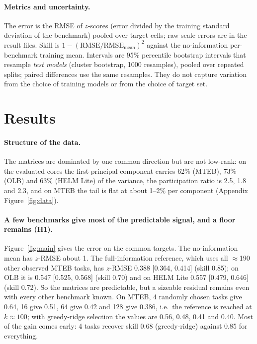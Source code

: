 \documentclass{article}
\begin{document}
\paragraph{Metrics and uncertainty.} The error is the RMSE of $z$-scores (error divided by the training standard deviation of the benchmark) pooled over target cells; raw-scale errors are in the result files. Skill is $1-(\mathrm{RMSE}/\mathrm{RMSE}_{\mathrm{mean}})^2$ against the no-information per-benchmark training mean. Intervals are 95\% percentile bootstrap intervals that resample \emph{test models} (cluster bootstrap, 1000 resamples), pooled over repeated splits; paired differences use the same resamples. They do not capture variation from the choice of training models or from the choice of target set.

\section{Results}
\label{sec:results}
\begin{table}[t]
\caption{The three score matrices. The evaluated core of MTEB is the dense core described in Section~\ref{sec:protocol}.}
\label{tab:data}
\centering\scriptsize
\resizebox{\linewidth}{!}{}
\end{table}

\paragraph{Structure of the data.} The matrices are dominated by one common direction but are not low-rank: on the evaluated cores the first principal component carries 62\% (MTEB), 73\% (OLB) and 63\% (HELM Lite) of the variance, the participation ratio is 2.5, 1.8 and 2.3, and on MTEB the tail is flat at about 1--2\% per component (Appendix Figure~\ref{fig:data}).



\paragraph{A few benchmarks give most of the predictable signal, and a floor remains (H1).} Figure~\ref{fig:main} gives the error on the common targets. The no-information mean has $z$-RMSE about 1. The full-information reference, which uses all $\approx$190 other observed MTEB tasks, has $z$-RMSE 0.388 [0.364, 0.414] (skill 0.85); on OLB it is 0.547 [0.525, 0.568] (skill 0.70) and on HELM Lite 0.557 [0.479, 0.646] (skill 0.72). So the matrices are predictable, but a sizeable residual remains even with every other benchmark known. On MTEB, 4 randomly chosen tasks give 0.64, 16 give 0.51, 64 give 0.42 and 128 give 0.386, i.e.\ the reference is reached at $k\approx100$; with greedy-ridge selection the values are 0.56, 0.48, 0.41 and 0.40. Most of the gain comes early: 4 tasks recover skill 0.68 (greedy-ridge) against 0.85 for everything.
\end{document}
